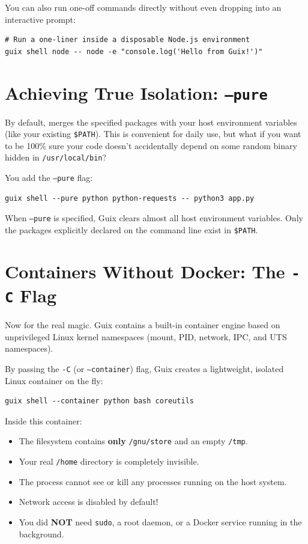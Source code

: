 You can also run one-off commands directly without even dropping into an interactive prompt:

\begin{lstlisting}[style=guixcli]
# Run a one-liner inside a disposable Node.js environment
guix shell node -- node -e "console.log('Hello from Guix!')"
\end{lstlisting}

\section{Achieving True Isolation: \texttt{--pure}}

By default,  merges the specified packages with your host environment variables (like your existing \texttt{\$PATH}). This is convenient for daily use, but what if you want to be 100\% sure your code doesn't accidentally depend on some random binary hidden in \texttt{/usr/local/bin}?

You add the \texttt{--pure} flag:

\begin{lstlisting}[style=guixcli]
guix shell --pure python python-requests -- python3 app.py
\end{lstlisting}

When \texttt{--pure} is specified, Guix clears almost all host environment variables. Only the packages explicitly declared on the command line exist in \texttt{\$PATH}.

\section{Containers Without Docker: The \texttt{-C} Flag}

Now for the real magic. Guix contains a built-in container engine based on unprivileged Linux kernel namespaces (mount, PID, network, IPC, and UTS namespaces).

By passing the \texttt{-C} (or \texttt{--container}) flag, Guix creates a lightweight, isolated Linux container on the fly:

\begin{lstlisting}[style=guixcli]
guix shell --container python bash coreutils
\end{lstlisting}

Inside this container:
\begin{itemize}
  \item The filesystem contains \textbf{only} \texttt{/gnu/store} and an empty \texttt{/tmp}.
  \item Your real \texttt{/home} directory is completely invisible.
  \item The process cannot see or kill any processes running on the host system.
  \item Network access is disabled by default!
  \item You did \textbf{NOT} need \texttt{sudo}, a root daemon, or a Docker service running in the background.
\end{itemize}

